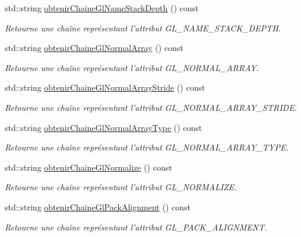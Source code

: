 \begin{DoxyCompactItemize}
std\-::string \hyperlink{group__utilitaire_ga04c7aa5d2e684fa0029e53b8c3b2cda8}{obtenir\-Chaine\-Gl\-Name\-Stack\-Depth} () const 
\begin{DoxyCompactList}\small\item\em Retourne une chaîne représentant l'attribut G\-L\-\_\-\-N\-A\-M\-E\-\_\-\-S\-T\-A\-C\-K\-\_\-\-D\-E\-P\-T\-H. \end{DoxyCompactList}\item 
std\-::string \hyperlink{group__utilitaire_gaa71b4ce64f1a5f86f8822904e51b549f}{obtenir\-Chaine\-Gl\-Normal\-Array} () const 
\begin{DoxyCompactList}\small\item\em Retourne une chaîne représentant l'attribut G\-L\-\_\-\-N\-O\-R\-M\-A\-L\-\_\-\-A\-R\-R\-A\-Y. \end{DoxyCompactList}\item 
std\-::string \hyperlink{group__utilitaire_ga9388bcac733bb55d8bff349828b9d86d}{obtenir\-Chaine\-Gl\-Normal\-Array\-Stride} () const 
\begin{DoxyCompactList}\small\item\em Retourne une chaîne représentant l'attribut G\-L\-\_\-\-N\-O\-R\-M\-A\-L\-\_\-\-A\-R\-R\-A\-Y\-\_\-\-S\-T\-R\-I\-D\-E. \end{DoxyCompactList}\item 
std\-::string \hyperlink{group__utilitaire_gac2ac905eb6421d2ff8edb736557f40e5}{obtenir\-Chaine\-Gl\-Normal\-Array\-Type} () const 
\begin{DoxyCompactList}\small\item\em Retourne une chaîne représentant l'attribut G\-L\-\_\-\-N\-O\-R\-M\-A\-L\-\_\-\-A\-R\-R\-A\-Y\-\_\-\-T\-Y\-P\-E. \end{DoxyCompactList}\item 
std\-::string \hyperlink{group__utilitaire_gab8f8c7f8e749817f94751308b2344af4}{obtenir\-Chaine\-Gl\-Normalize} () const 
\begin{DoxyCompactList}\small\item\em Retourne une chaîne représentant l'attribut G\-L\-\_\-\-N\-O\-R\-M\-A\-L\-I\-Z\-E. \end{DoxyCompactList}\item 
std\-::string \hyperlink{group__utilitaire_ga7b46757dfa6068f0833baab8d98d2c2a}{obtenir\-Chaine\-Gl\-Pack\-Alignment} () const 
\begin{DoxyCompactList}\small\item\em Retourne une chaîne représentant l'attribut G\-L\-\_\-\-P\-A\-C\-K\-\_\-\-A\-L\-I\-G\-N\-M\-E\-N\-T. \end{DoxyCompactList}\item 

\end{DoxyCompactItemize}
